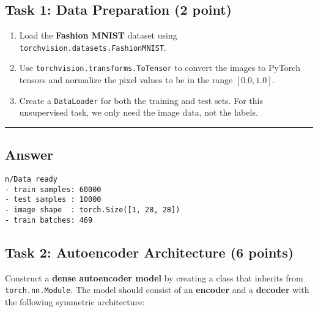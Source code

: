 \documentclass[
  letterpaper,
  DIV=11,
  numbers=noendperiod]{scrartcl}
\providecommand{\tightlist}{%
  \setlength{\itemsep}{0pt}\setlength{\parskip}{0pt}}\usepackage{longtable,booktabs,array}
\begin{document}
\subsection{Task 1: Data Preparation (2
point)}\label{task-1-data-preparation-2-point}

\begin{enumerate}
\def\labelenumi{\arabic{enumi}.}
\tightlist
\item
  Load the \textbf{Fashion MNIST} dataset using
  \texttt{torchvision.datasets.FashionMNIST}.
\item
  Use \texttt{torchvision.transforms.ToTensor} to convert the images to
  PyTorch tensors and normalize the pixel values to be in the range
  \([0.0, 1.0]\).
\item
  Create a \texttt{DataLoader} for both the training and test sets. For
  this unsupervised task, we only need the image data, not the labels.
\end{enumerate}

\begin{center}\rule{0.5\linewidth}{0.5pt}\end{center}

\subsection{Answer}\label{answer-3}

\label{task1}
\begin{verbatim}
n/Data ready
- train samples: 60000
- test samples : 10000
- image shape  : torch.Size([1, 28, 28])
- train batches: 469
\end{verbatim}

\subsection{Task 2: Autoencoder Architecture (6
points)}\label{task-2-autoencoder-architecture-6-points}

Construct a \textbf{dense autoencoder model} by creating a class that
inherits from \texttt{torch.nn.Module}. The model should consist of an
\textbf{encoder} and a \textbf{decoder} with the following symmetric
architecture:
\end{document}
